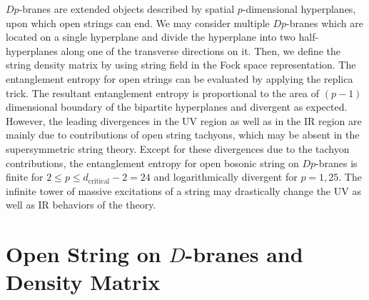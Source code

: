 \documentclass[aps,showpacs,showkeys]{revtex4}
\begin{document}
$Dp$-branes are extended objects described by spatial $p$-dimensional hyperplanes, upon which open strings can end. We may consider multiple $Dp$-branes which are located on a single hyperplane and divide the 
hyperplane into two half-hyperplanes along one of the transverse directions on it. Then, we define the
string density matrix by using string field in the Fock space representation.      
The entanglement entropy for open strings can be evaluated by applying the replica trick. The resultant 
entanglement entropy is proportional to the area of $(p-1)$ dimensional boundary of the bipartite hyperplanes and divergent as expected.  
However, the leading divergences in the UV region as well as in the IR region are mainly due to 
contributions of open string tachyons, which may be absent in the supersymmetric string theory. Except for these 
divergences due to the tachyon contributions, the entanglement entropy for open bosonic string on $Dp$-branes is finite for $2 \le p \le d_{\text{critical}} -2=24$ and logarithmically divergent for $p =1, 25$.  
The infinite tower of massive excitations of a string may drastically change the UV as well as IR behaviors 
of the theory.  


 


\section{Open String on $D$-branes and Density Matrix}
\end{document}
